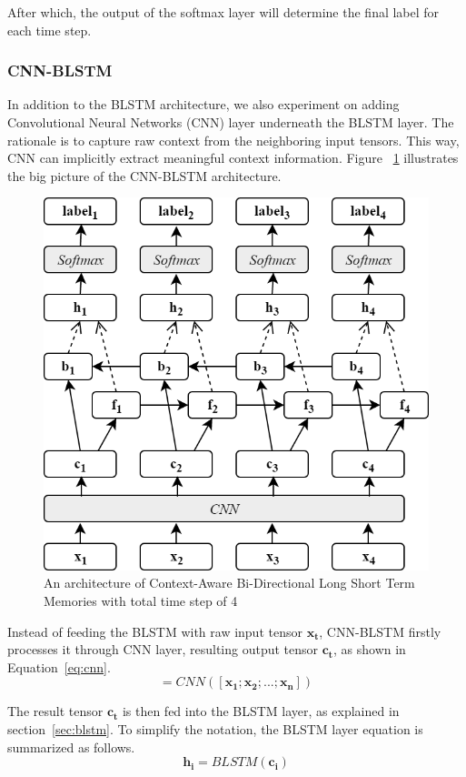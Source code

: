 After which, the output of the softmax layer will determine the final label for each time step.

\subsubsection{CNN-BLSTM}
In addition to the BLSTM architecture, we also experiment on adding Convolutional Neural Networks (CNN) layer underneath the BLSTM layer. The rationale is to capture raw context from the neighboring input tensors. This way, CNN can implicitly extract meaningful context information. Figure ~\ref{fig:cnnblstm} illustrates the big picture of the CNN-BLSTM architecture.

\begin{figure}
	\centering
	\includegraphics[width=0.75\linewidth]{images/cnnblstm}
	\caption{An architecture of Context-Aware Bi-Directional Long Short Term Memories with total time step of 4}
	\label{fig:cnnblstm}
\end{figure}

Instead of feeding the BLSTM with raw input tensor $\mathbf{x_{t}}$, CNN-BLSTM firstly processes it through CNN layer, resulting output tensor $\mathbf{c_{t}}$, as shown in Equation~\ref{eq:cnn}.
\begin{equation}
[\mathbf{c_{1}}; \mathbf{c_{2}}; ...; \mathbf{c_{n}}] = CNN([\mathbf{x_{1}}; \mathbf{x_{2}}; ...; \mathbf{x_{n}}])
\end{equation}

The result tensor $\mathbf{c_{t}}$ is then fed into the BLSTM layer, as explained in section~\ref{sec:blstm}. To simplify the notation, the BLSTM layer equation is summarized as follows.
\begin{equation}
\mathbf{h_{i}} = BLSTM(\mathbf{c_{i}})
\end{equation}

